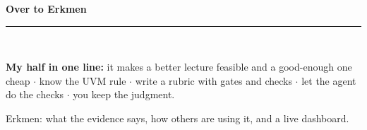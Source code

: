 \documentclass[aspectratio=169, 10pt]{beamer}
\begin{document}
{
\begin{frame}
\centering\vfill
{\fontsize{20}{26}\bfseries\selectfont\color{white} Over to Erkmen}\\[8pt]
{\color{UVMGold}\rule{6cm}{0.8pt}}\\[8pt]
\begin{tcolorbox}[accentbox, width=11cm, top=4pt, bottom=4pt]
\centering\small
\textbf{My half in one line:} it makes a better lecture feasible and a good-enough one cheap $\cdot$ know the UVM rule $\cdot$ write a rubric with gates and checks $\cdot$ let the agent do the checks $\cdot$ you keep the judgment.
\end{tcolorbox}
\vskip10pt
{\normalsize\color{PaleSage} Erkmen: what the evidence says, how others are using it, and a live dashboard.}
\vfill
\end{frame}
}
\end{document}
